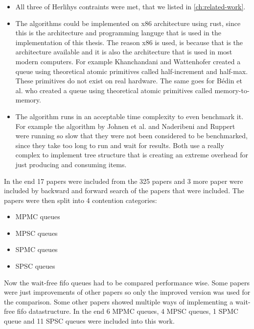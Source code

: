 \begin{itemize}
   \item All three of Herlihys contraints were met, that we listed in \cref{ch:related-work}.
   \item The algorithms could be implemented on x86 architecture using rust, since this is the architecture and programming languge that is used in the implementation of this thesis. The reason x86 is used, is because that is the architecture available and it is also the architecture that is used in most modern computers. For example Khanchandani and Wattenhofer \cite{halfincrementhalfmax} created a queue using theoretical atomic primitives called half-increment and half-max. These primitives do not exist on real hardware. The same goes for Bédin et al. \cite{memorytomemory} who created a queue using theoretical atomic primitives called memory-to-memory.
   \item The algorithm runs in an acceptable time complexity to even benchmark it. For example the algorithm by Johnen et al. \cite{johnen_et_al:LIPIcs.OPODIS.2022.4} and Naderibeni and Ruppert \cite{polylog} were running so slow that they were not been considered to be benchmarked, since they take too long to run and wait for results. Both use a really complex to implement tree structure that is creating an extreme overhead for just producing and consuming items. 
\end{itemize}
In the end 17 papers were included from the 325 papers and 3 more paper were included by backward and forward search of the papers that were included. The papers were then split into 4 contention categories:
\begin{itemize}
   \item \ac{MPMC} queues \cite{Kogan2011WaitFreeQueues,FeldmanDechev2015WaitFreeRingBuffer,kogan2012methodology,FeldmanDechevV2,FeldmanDechevV3,RamalheteQueue,wCQWaitFreeQueue,Verma2013Scalable,FastFetchAndAddWaitFreeQueue}
   \item \ac{MPSC} queues \cite{WangCacheCoherent,adampsc,jiffy,JayantiLog,Drescher2015GuardedSections}
   \item \ac{SPMC} queues \cite{Mateíspmc}
   \item \ac{SPSC} queues \cite{Lamport1983SPSCCircularBuffer,torquati2010singleproducersingleconsumerqueuessharedcache,Aldinucci2012EfficientSync,Wang2013BQueue,MaffioneCacheAware,ffq}
\end{itemize}
Now the wait-free fifo queues had to be compared performance wise. Some papers were just improvements of other papers so only the improved version was used for the comparison. Some other papers showed multiple ways of implementing a wait-free fifo datastructure. In the end 6 \ac{MPMC} queues, 4 \ac{MPSC} queues, 1 \ac{SPMC} queue and 11 \ac{SPSC} queues were included into this work.